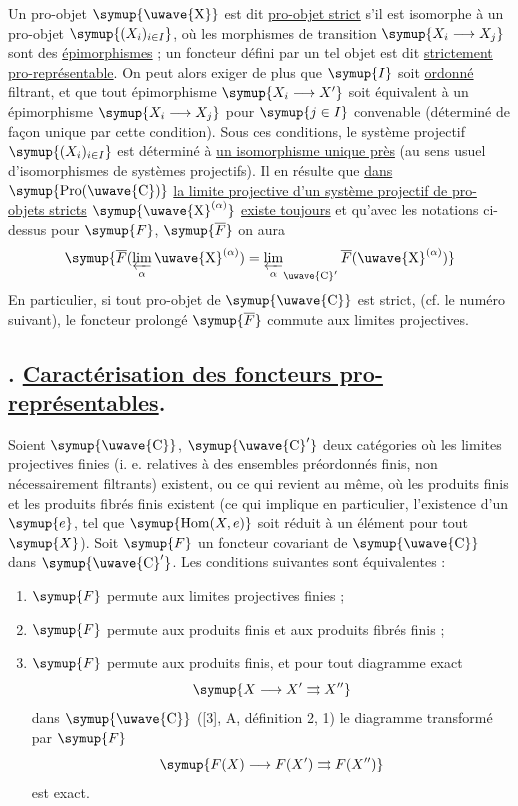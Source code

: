 Un pro-objet $\symup{\text{\uwave{X}}}$ est dit \uline{pro-objet strict} s'il est isomorphe
à un pro-objet $\symup{(X_i)_{i\in I}}$, où les morphismes de transition
$\symup{X_i\longrightarrow X_j}$ sont des \uline{épimorphismes} ; un foncteur défini par un
tel objet est dit \uline{strictement pro-représentable}. On peut alors exiger de
plus que $\symup{I}$ soit \uline{ordonné} filtrant, et que tout épimorphisme
$\symup{X_i\longrightarrow X'}$ soit équivalent à un épimorphisme
$\symup{X_i\longrightarrow X_j}$ pour $\symup{j\in I}$ convenable (déterminé de façon unique
par cette condition). Sous ces conditions, le système projectif
$\symup{(X_i)_{i\in I}}$ est déterminé à \uline{un isomorphisme unique près} (au sens usuel
d'isomorphismes de systèmes projectifs). Il en résulte que \uline{dans}
$\symup{\operatorname{Pro}(\text{\uwave{C}})}$ \uline{la limite projective d'un système projectif de pro-objets stricts} $\symup{\text{\uwave{X}}^{(\alpha)}}$ \uline{existe toujours} et qu'avec les
notations ci-dessus pour $\symup{F}$, $\symup{\overline F}$ on aura
\[
  \symup{\overline F(\varprojlim\limits_\alpha\text{\uwave{X}}^{(\alpha)})
  =\mathop{\underset{\alpha}{\varprojlim}}\nolimits_{\text{\uwave{C}}'}
  \overline F(\text{\uwave{X}}^{(\alpha)})}
\]
En particulier, si tout pro-objet de $\symup{\text{\uwave{C}}}$ est strict, (cf. le numéro
suivant), le foncteur prolongé $\symup{\overline F}$ commute aux limites projectives.

\subsection*{. \uline{Caractérisation des foncteurs pro-représentables}.}

Soient $\symup{\text{\uwave{C}}}$, $\symup{\text{\uwave{C}}'}$ deux catégories où les limites projectives
finies (i. e. relatives à des ensembles préordonnés finis, non nécessairement
filtrants) existent, ou ce qui revient au même, où les produits finis et les
produits fibrés finis existent (ce qui implique en particulier, l'existence
d'un  $\symup{e}$, tel que $\symup{\operatorname{Hom}(X,e)}$ soit
réduit à un élément pour tout $\symup{X}$). Soit $\symup{F}$ un foncteur covariant de
$\symup{\text{\uwave{C}}}$ dans $\symup{\text{\uwave{C}}'}$. Les conditions suivantes sont équivalentes :

\begin{enumerate}
\item[i.] $\symup{F}$ permute aux limites projectives finies ;
\item[ii.] $\symup{F}$ permute aux produits finis et aux produits fibrés finis ;
\item[iii.] $\symup{F}$ permute aux produits finis, et pour tout diagramme exact
\[
  \symup{X\longrightarrow X'\rightrightarrows X''}
\]
dans $\symup{\text{\uwave{C}}}$ ([3], A, définition 2, 1) le diagramme transformé par $\symup{F}$
\[
  \symup{F(X)\longrightarrow F(X')\rightrightarrows F(X'')}
\]
est exact.
\end{enumerate}

